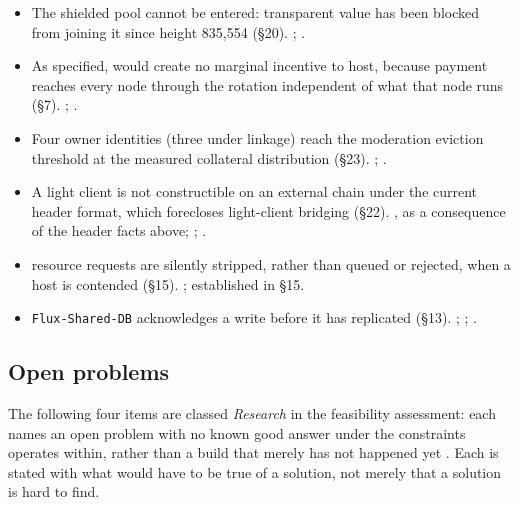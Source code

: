 \begin{itemize}
{  peer-to-peer fallback}{routing layer's (\FDM{}'s) sole application-discovery source, with no on-chain or
  peer-to-peer fallback, although the nodes themselves replicate specifications and locations by
  peer-to-peer gossip} (§12). \shipped; .
\item The shielded pool cannot be entered: transparent value has been blocked from joining it since
  height 835,554 (§20). \shipped; .
\item As specified, \PNR would create no marginal incentive to host, because payment reaches every
  node through the \PoN rotation independent of what that node runs (§7). \planned;
  .
\item Four owner identities (three under linkage) reach the moderation eviction threshold at the measured
  collateral distribution (§23). \shipped; .
\item A \Flux light client is not constructible on an external chain under the current header format,
  which forecloses light-client bridging (§22). \shipped, as a consequence of the header facts above;
  ; .
\item {} resource requests are silently stripped, rather than queued or rejected, when a host is
  contended (§15). \shipped; established in §15.
\item \texttt{Flux-Shared-DB} acknowledges a write before it has replicated (§13). \shipped;
  ;
  .
\end{itemize}

\subsection{Open problems}

The following four items are classed \emph{Research} in the feasibility assessment: each names an
open problem with no known good answer under the constraints \Flux operates within, rather than a
build that merely has not happened yet . Each is stated with what would
have to be true of a solution, not merely that a solution is hard to find.

